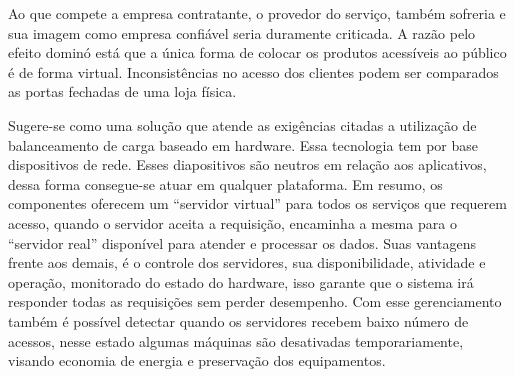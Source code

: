 Ao que compete a empresa contratante, o provedor do serviço, também sofreria e sua imagem como empresa confiável seria
duramente criticada. A razão pelo efeito dominó está que a única forma de colocar os produtos acessíveis ao público é de
forma virtual. Inconsistências no acesso dos clientes podem ser comparados as portas fechadas de uma loja física.


Sugere-se como uma solução que atende as exigências citadas a utilização de balanceamento de carga baseado em hardware.
Essa tecnologia tem por base dispositivos de rede. Esses diapositivos são neutros em relação aos aplicativos, dessa forma
consegue-se atuar em qualquer plataforma. Em resumo, os componentes oferecem um “servidor virtual” para todos os serviços
que requerem acesso, quando o servidor aceita a requisição, encaminha a mesma para o “servidor real” disponível para atender
e processar os dados. Suas vantagens frente aos demais, é o controle dos servidores, sua disponibilidade, atividade e
operação, monitorado do estado do hardware, isso garante que o sistema irá responder todas as requisições sem perder
desempenho. Com esse gerenciamento também é possível detectar quando os servidores recebem baixo número de acessos, nesse
estado algumas máquinas são desativadas temporariamente, visando economia de energia e preservação dos equipamentos.  

